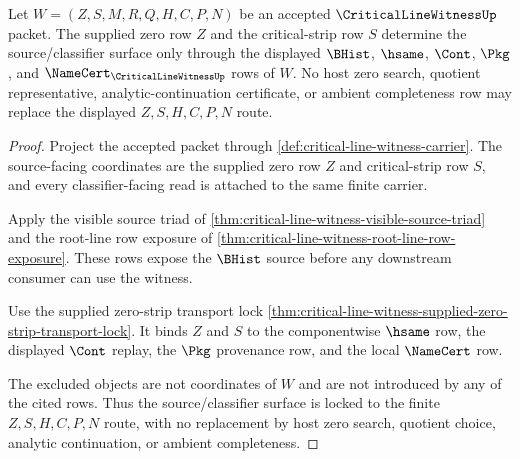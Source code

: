 \begin{theorem}
\label{thm:critical-line-witness-zero-strip-source-classifier-lock}
Let $W=(Z,S,M,R,Q,H,C,P,N)$ be an accepted $\CriticalLineWitnessUp$ packet. The supplied zero row $Z$ and the critical-strip row $S$ determine the source/classifier surface only through the displayed $\BHist$, $\hsame$, $\Cont$, $\Pkg$, and $\NameCert_{\CriticalLineWitnessUp}$ rows of $W$. No host zero search, quotient representative, analytic-continuation certificate, or ambient completeness row may replace the displayed $Z,S,H,C,P,N$ route.
\end{theorem}
\begin{proof}
Project the accepted packet through \autoref{def:critical-line-witness-carrier}. The source-facing coordinates are the supplied zero row $Z$ and critical-strip row $S$, and every classifier-facing read is attached to the same finite carrier.

Apply the visible source triad of \autoref{thm:critical-line-witness-visible-source-triad} and the root-line row exposure of \autoref{thm:critical-line-witness-root-line-row-exposure}. These rows expose the $\BHist$ source before any downstream consumer can use the witness.

Use the supplied zero-strip transport lock \autoref{thm:critical-line-witness-supplied-zero-strip-transport-lock}. It binds $Z$ and $S$ to the componentwise $\hsame$ row, the displayed $\Cont$ replay, the $\Pkg$ provenance row, and the local $\NameCert$ row.

The excluded objects are not coordinates of $W$ and are not introduced by any of the cited rows. Thus the source/classifier surface is locked to the finite $Z,S,H,C,P,N$ route, with no replacement by host zero search, quotient choice, analytic continuation, or ambient completeness.
\end{proof}

